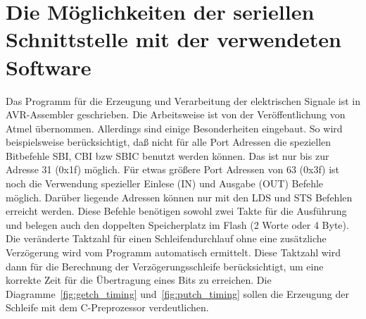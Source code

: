 \section{Die Möglichkeiten der seriellen Schnittstelle mit der verwendeten Software}

Das Programm für die Erzeugung und Verarbeitung der elektrischen Signale ist in AVR-Assembler geschrieben.
Die Arbeitsweise ist von der Veröffentlichung von Atmel übernommen.
Allerdings sind einige Besonderheiten eingebaut. 
So wird beispielsweise berücksichtigt, daß nicht für alle Port Adressen die speziellen Bitbefehle SBI, CBI
bzw SBIC benutzt werden können. Das ist nur bis zur Adresse 31 (0x1f) möglich. Für etwas größere
Port Adressen von 63 (0x3f) ist noch die Verwendung spezieller Einlese (IN) und Ausgabe (OUT) Befehle
möglich. Darüber liegende Adressen können nur mit den LDS und STS Befehlen erreicht werden.
Diese Befehle benötigen sowohl zwei Takte für die Ausführung und belegen auch den doppelten
Speicherplatz im Flash (2 Worte oder 4 Byte).
Die veränderte Taktzahl für einen Schleifendurchlauf ohne eine zusätzliche Verzögerung wird 
vom Programm automatisch ermittelt.
Diese Taktzahl wird dann für die Berechnung der Verzögerungsschleife berücksichtigt,
um eine korrekte Zeit für die Übertragung eines Bits zu erreichen. 
Die Diagramme~\ref{fig:getch_timing} und~\ref{fig:putch_timing} sollen  die Erzeugung der Schleife mit
dem C-Preprozessor verdeutlichen.

